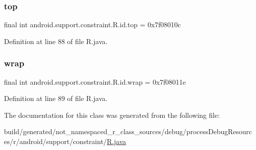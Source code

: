 \subsubsection{\texorpdfstring{top}{top}}
{\footnotesize\ttfamily final int android.\+support.\+constraint.\+R.\+id.\+top = 0x7f08010c\hspace{0.3cm}{\ttfamily [static]}}



Definition at line 88 of file R.\+java.

\mbox{\label{classandroid_1_1support_1_1constraint_1_1_r_1_1id_ae0562e247c624b01fdf91a6e003f141d}} 
\subsubsection{\texorpdfstring{wrap}{wrap}}
{\footnotesize\ttfamily final int android.\+support.\+constraint.\+R.\+id.\+wrap = 0x7f08011e\hspace{0.3cm}{\ttfamily [static]}}



Definition at line 89 of file R.\+java.



The documentation for this class was generated from the following file\+:\begin{DoxyCompactItemize}
\item 
build/generated/not\+\_\+namespaced\+\_\+r\+\_\+class\+\_\+sources/debug/process\+Debug\+Resources/r/android/support/constraint/\mbox{\hyperlink{android_2support_2constraint_2_r_8java}{R.\+java}}\end{DoxyCompactItemize}

